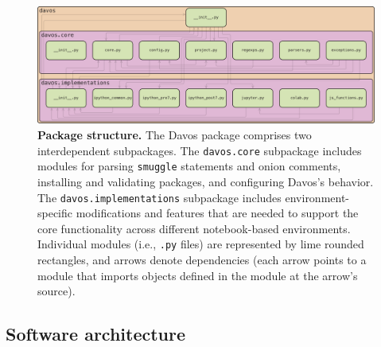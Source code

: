 \documentclass[preprint,12pt,a4paper]{elsarticle}
\begin{document}
\begin{figure}[tp]
\centering
\includegraphics[width=\textwidth]{figs/package_structure}
\caption{\small \textbf{Package structure.} The Davos package
  comprises two interdependent subpackages.  The \texttt{davos.core}
  subpackage includes modules for parsing \texttt{smuggle} statements
  and onion comments, installing and validating packages, and
  configuring Davos's behavior.  The
  \texttt{davos.implementations} subpackage includes
  environment-specific modifications and features that are needed to
  support the core functionality across different notebook-based
  environments.  Individual modules (i.e., \texttt{.py} files) are represented by lime
  rounded rectangles, and arrows denote dependencies (each arrow
  points to a module that imports objects defined in the module at the
  arrow's source).}
\label{fig:package-structure}
\end{figure}

\subsection{Software architecture}
\end{document}
